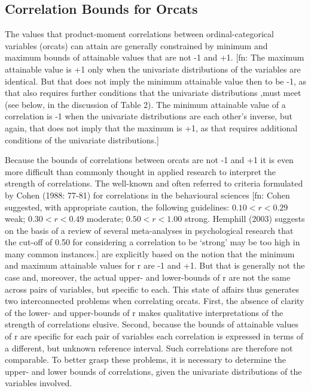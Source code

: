 \documentclass[
  12pt,
]{article}
\theoremstyle{plain}
\theoremstyle{definition}
\theoremstyle{remark}
\begin{document}
\subsection{Correlation Bounds for
Orcats}\label{correlation-bounds-for-orcats}

The values that product-moment correlations between ordinal-categorical
variables (orcats) can attain are generally constrained by minimum and
maximum bounds of attainable values that are not -1 and +1. {[}fn: The
maximum attainable value is +1 only when the univariate distributions of
the variables are identical. But that does not imply the minimum
attainable value then to be -1, as that also requires further conditions
that the univariate distributions ,must meet (see below, in the
discussion of Table 2). The minimum attainable value of a correlation is
-1 when the univariate distributions are each other's inverse, but
again, that does not imply that the maximum is +1, as that requires
additional conditions of the univariate distributions.{]}

Because the bounds of correlations between orcats are not -1 and +1 it
is even more difficult than commonly thought in applied research to
interpret the strength of correlations. The well-known and often
referred to criteria formulated by Cohen (1988: 77-81) for correlations
in the behavioural sciences {[}fn: Cohen suggested, with appropriate
caution, the following guidelines: \(0.10<r<0.29\) weak; \(0.30<r<0.49\)
moderate; \(0.50<r<1.00\) strong. Hemphill (2003) suggests on the basis
of a review of several meta-analyses in psychological research that the
cut-off of 0.50 for considering a correlation to be `strong' may be too
high in many common instances.{]} are explicitly based on the notion
that the minimum and maximum attainable values for r are -1 and +1. But
that is generally not the case and, moreover, the actual upper- and
lower-bounds of r are not the same across pairs of variables, but
specific to each. This state of affairs thus generates two
interconnected problems when correlating orcats. First, the absence of
clarity of the lower- and upper-bounds of r makes qualitative
interpretations of the strength of correlations elusive. Second, because
the bounds of attainable values of r are specific for each pair of
variables each correlation is expressed in terms of a different, but
unknown reference interval. Such correlations are therefore not
comparable. To better grasp these problems, it is necessary to determine
the upper- and lower bounds of correlations, given the univariate
distributions of the variables involved.
\end{document}

